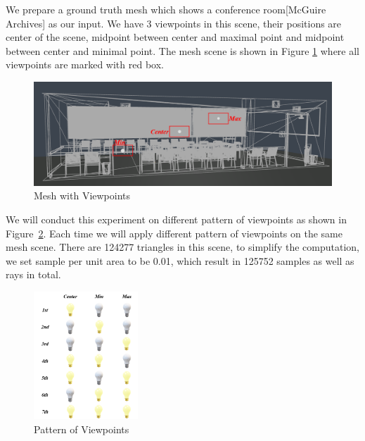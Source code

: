 \documentclass[11pt, a4paper,oneside,chapterprefix=false]{scrbook}
\begin{document}
We prepare a ground truth mesh which shows a conference room[McGuire Archives] as our input. We have 3 viewpoints in this scene, their positions are center of the scene, midpoint between center and maximal point and midpoint between center and minimal point. The mesh scene is shown in Figure \ref{fig:mesh with viewpoints} where all viewpoints are marked with red box. 

\noindent
\begin{minipage}{\textwidth}
    \begin{figure}[H]
        \centering
        \includegraphics*[width=1.0\textwidth]{figures/mesh with vps.png}
        \caption{Mesh with Viewpoints}
        \label{fig:mesh with viewpoints}
    \end{figure}
\end{minipage}
\hfill

We will conduct this experiment on different pattern of viewpoints as shown in Figure~\ref{fig:pattern of viewpoints}. Each time we will apply different pattern of viewpoints on the same mesh scene. There are 124277 triangles in this scene, to simplify the computation, we set sample per unit area to be 0.01, which result in 125752 samples as well as rays in total.
\noindent
\begin{minipage}{\textwidth}
	\begin{figure}[H]
		\centering
		\includegraphics*[width=0.35\textwidth]{figures/experiment mesh.png}
		\caption{Pattern of Viewpoints}
		\label{fig:pattern of viewpoints}
	\end{figure}
\end{minipage} 
\end{document}

